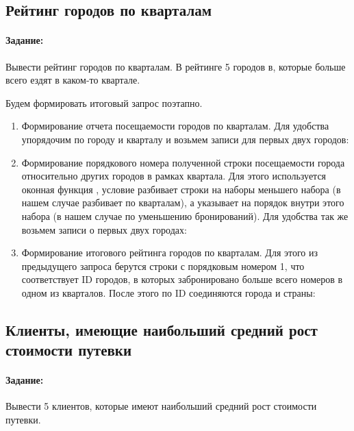 \subsection{Рейтинг городов по кварталам}

\paragraph{Задание:} Вывести рейтинг городов по кварталам. В рейтинге 5 городов в, которые больше всего ездят в каком-то квартале.

Будем формировать итоговый запрос поэтапно.

\begin{enumerate}[leftmargin=0em]
	\item Формирование отчета посещаемости городов по кварталам. Для удобства упорядочим по городу и кварталу и возьмем записи для первых двух городов:


	\item Формирование порядкового номера полученной строки посещаемости города относительно других городов в рамках квартала. Для этого используется оконная функция , условие  разбивает строки на наборы меньшего набора (в нашем случае разбивает по кварталам), а  указывает на порядок внутри этого набора (в нашем случае по уменьшению бронирований). Для удобства так же возьмем записи о первых двух городах:

	\item Формирование итогового рейтинга городов по кварталам. Для этого из предыдущего запроса берутся строки с порядковым номером 1, что соответствует ID городов, в которых забронировано больше всего номеров в одном из кварталов. После этого по ID соединяются города и страны:

\end{enumerate}

\subsection{Клиенты, имеющие наибольший средний рост стоимости путевки}

\paragraph{Задание:} Вывести 5 клиентов, которые имеют наибольший средний рост стоимости путевки.


